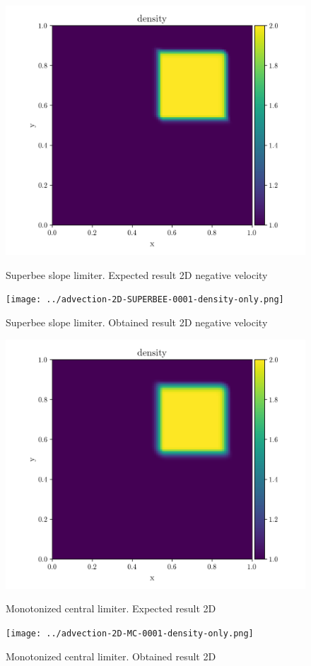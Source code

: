 \begin{figure}[htbp]
    \centering
	\includegraphics[width=.7\textwidth]{./figures/advection-2D-SUPERBEE-0001-density-only.png}%
	\caption{Superbee slope limiter. Expected result 2D negative velocity}
	\texttt{[image: ../advection-2D-SUPERBEE-0001-density-only.png]}%
	\caption{Superbee slope limiter. Obtained result 2D negative velocity}
\end{figure}

\begin{figure}[htbp]
    \centering
	\includegraphics[width=.7\textwidth]{./figures/advection-2D-MC-0001-density-only.png}%
	\caption{Monotonized central limiter. Expected result 2D}
	\texttt{[image: ../advection-2D-MC-0001-density-only.png]}%
	\caption{Monotonized central limiter. Obtained result 2D}
\end{figure}


